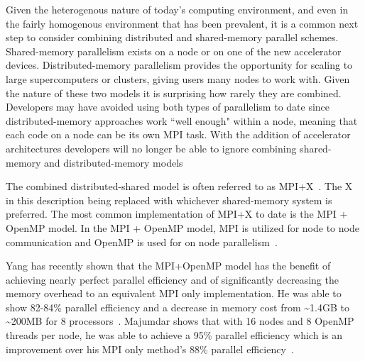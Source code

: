 %
Given the heterogenous nature of today's computing environment, and even in the fairly homogenous environment that has been prevalent, it is a common next step to consider combining distributed and shared-memory parallel schemes.
%
Shared-memory parallelism exists on a node or on one of the new accelerator devices.
%
Distributed-memory parallelism provides the opportunity for scaling to large supercomputers or clusters, giving users many nodes to work with.
%
Given the nature of these two models it is surprising how rarely they are combined.
%
Developers may have avoided using both types of parallelism to date since 
distributed-memory approaches work ``well enough" within a node, meaning
that each code on a node can be its own MPI task.
%
With the addition of accelerator architectures developers will no longer be able to ignore combining shared-memory and distributed-memory models
%

%
The combined distributed-shared model is often referred to as MPI+X~\cite{michaelwolfe2014}.
%
The X in this description being replaced with whichever shared-memory system is preferred.
%
The most common implementation of MPI+X to date is the MPI + OpenMP model.
%
In the MPI + OpenMP model, MPI is utilized for node to node communication and OpenMP is used for on node parallelism~\cite{michaelwolfe2014}.
%

%
Yang has recently shown that the MPI+OpenMP model has the benefit of achieving nearly perfect parallel efficiency and of significantly decreasing the memory overhead to an equivalent MPI only implementation.
%
He was able to show 82-84\% parallel efficiency and a decrease in memory cost from \textasciitilde1.4GB to \textasciitilde200MB for 8 processors~\cite{yanghybrid}.
%
Majumdar shows that with 16 nodes and 8 OpenMP threads per node, he was able to achieve a 95\% parallel efficiency which is an improvement over his MPI only method's 88\% parallel efficiency~\cite{majumdar2000parallel}. 
%
